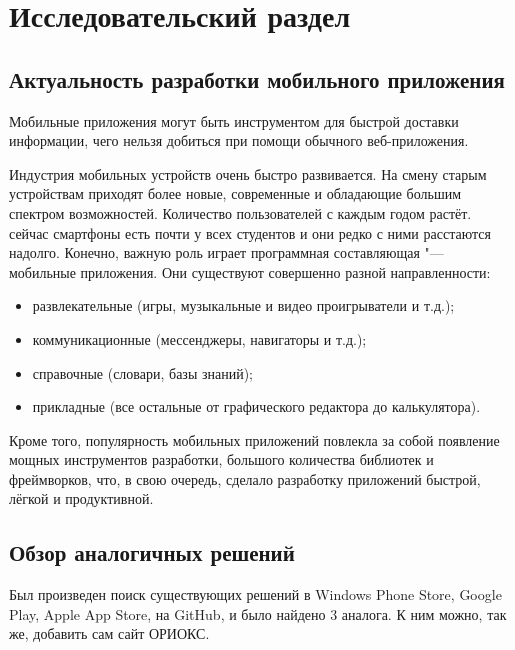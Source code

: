 \chapter{Исследовательский раздел}
\label{ch:research}
%
%

\section{Актуальность разработки мобильного приложения}
\label{sec:whyApp}

Мобильные приложения могут быть инструментом для быстрой доставки информации, чего нельзя добиться при помощи обычного веб-приложения.

Индустрия мобильных устройств очень быстро развивается.
На смену старым устройствам приходят более новые, современные и обладающие большим спектром возможностей.
Количество пользователей с каждым годом растёт.
сейчас смартфоны есть почти у всех студентов и они редко с ними расстаются надолго.
Конечно, важную роль играет программная составляющая "--- мобильные приложения.
Они существуют совершенно разной направленности:
\begin{itemize}
  \item развлекательные (игры, музыкальные и видео проигрыватели и т.д.);
  \item коммуникационные (мессенджеры, навигаторы и т.д.);
  \item справочные (словари, базы знаний);
  \item прикладные (все остальные от графического редактора до калькулятора).
\end{itemize}

Кроме того, популярность мобильных приложений повлекла за собой появление мощных инструментов разработки, большого количества библиотек и фреймворков, что, в свою очередь, сделало разработку приложений быстрой, лёгкой и продуктивной.


\section{Обзор аналогичных решений}
\label{sec:analogs}
Был произведен поиск существующих решений в Windows Phone Store, Google Play, Apple App Store, на GitHub, и было найдено 3 аналога.
К ним можно, так же, добавить сам сайт ОРИОКС.

